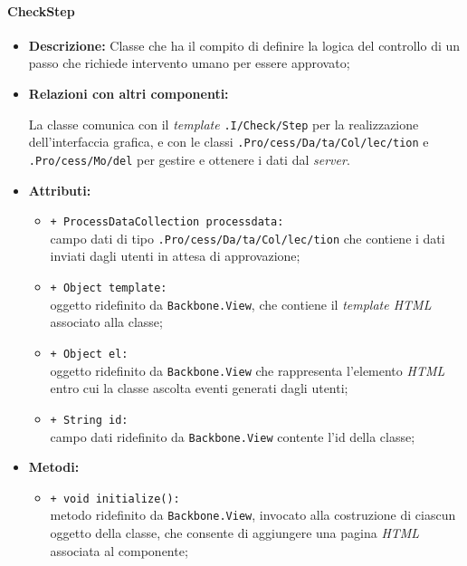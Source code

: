 \paragraph{CheckStep}
\label{checkStep}
\begin{flushleft}
\begin{itemize}
\item \textbf{Descrizione:} Classe che ha il compito di definire la logica del controllo di un passo che richiede intervento umano per essere approvato;
\item \textbf{Relazioni con altri componenti:}
\begin{sloppypar}
La classe comunica con il \textit{template} \texttt{\viewAdmin{}.I\fshyp{}Check\fshyp{}Step} per la realizzazione dell'interfaccia grafica, e con le classi \texttt{\collection{}.Pro\fshyp{}cess\fshyp{}Da\fshyp{}ta\fshyp{}Col\fshyp{}lec\fshyp{}tion} e \texttt{\model{}.Pro\fshyp{}cess\fshyp{}Mo\fshyp{}del} per gestire e ottenere i dati dal \textit{server}.
\end{sloppypar}
\item \textbf{Attributi:}
\begin{sloppypar}
\begin{itemize}
\item \texttt{+ ProcessDataCollection processdata:}\\ campo dati di tipo \texttt{\collection{}.Pro\fshyp{}cess\fshyp{}Da\fshyp{}ta\fshyp{}Col\fshyp{}lec\fshyp{}tion} che contiene i dati inviati dagli utenti in attesa di approvazione;
\item \texttt{+ Object template:}\\ oggetto ridefinito da \texttt{Backbone.View}, che contiene il \textit{template HTML} associato alla classe;
\item \texttt{+ Object el:}\\ oggetto ridefinito da \texttt{Backbone.View} che rappresenta l'elemento \textit{HTML} entro cui la classe ascolta eventi generati dagli utenti;
\item \texttt{+ String id:}\\ campo dati ridefinito da \texttt{Backbone.View} contente l'id della classe;
\end{itemize}
\end{sloppypar}
\item \textbf{Metodi:}
\begin{sloppypar}
\begin{itemize}
\item \texttt{+ void initialize():}\\ metodo ridefinito da \texttt{Backbone.View}, invocato alla costruzione di ciascun oggetto della classe, che consente di aggiungere una pagina \textit{HTML} associata al componente;

\end{itemize}
\end{sloppypar}
\end{itemize}
\end{flushleft}
